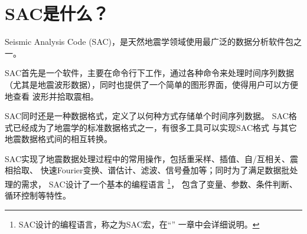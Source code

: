 \section{SAC是什么？}

Seismic Analysis Code (SAC)，是天然地震学领域使用最广泛的数据分析软件包之一。

SAC首先是一个软件，主要在命令行下工作，通过各种命令来处理时间序列数据
（尤其是地震波形数据），同时也提供了一个简单的图形界面，使得用户可以方便地查看
波形并拾取震相。

SAC同时还是一种数据格式，定义了以何种方式存储单个时间序列数据。
SAC格式已经成为了地震学的标准数据格式之一，有很多工具可以实现SAC格式
与其它地震数据格式间的相互转换。

SAC实现了地震数据处理过程中的常用操作，包括重采样、插值、自/互相关、震相拾取、
快速Fourier变换、谱估计、滤波、信号叠加等；同时为了满足数据批处理的需求，
SAC设计了一个基本的编程语言
\footnote{SAC设计的编程语言，称之为SAC宏，在``''
一章中会详细说明。}，
包含了变量、参数、条件判断、循环控制等特性。
